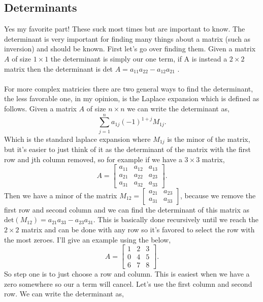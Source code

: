\documentclass{report}
\begin{document}
\begin{multicols}{2}
\section{Determinants}%
\label{sec: Determinants }
Yes my favorite part! These suck most times but are important to know. The determinant is very important for finding many things about a matrix (such as inversion) and should be known. First let's go over finding them. Given a matrix $ A $ of size $ 1 \times 1 $ the determinant is simply our one term, if A is instead a $ 2 \times 2 $ matrix then the determinant is  det $ A = a_{ 11 }a_{ 22 } - a_{ 12 }a_{ 21 } $ .\\\\
For more complex matricies there are two general ways to find the determinant, the less favorable one, in my opinion, is the Laplace expansion which is defined as follows. Given a matrix $ A $  of size $ n \times n $  we can write the determinant as, 
\[
\sum_{ j=1 } ^{ n } a_{ 1j }\left( -1 \right) ^{ 1+j }M_{ 1j }
.\] 
Which is the standard laplace expansion where $ M_{ 1j } $ is the minor of the matrix, but it's easier to just think of it as the determinant of the matrix with the first row and jth column removed, so for example if we have a $ 3 \times 3 $ matrix,
\[
A = \begin{bmatrix} a_{ 11 } & a_{ 12 } & a_{ 13 } \\ a_{ 21 } & a_{ 22 } & a_{ 23 } \\ a_{ 31 } & a_{ 32 } & a_{ 33 }\end{bmatrix}
.\] 
Then we have a minor of the matrix $ M_{ 12 } = \begin{bmatrix} a_{ 21 } & a_{ 23 } \\ a_{ 31 } & a_{ 33 }\end{bmatrix} $, because we remove the first row and second column and we can find the determinant of this matrix as $ \text{det}\left( M_{ 12 } \right) = a_{ 21 }a_{ 33 } - a_{ 23 }a_{ 31 } $. This is basically done recursively until we reach the $ 2 \times 2 $ matrix and can be done with any row so it's favored to select the row with the most zeroes. I'll give an example using the below,
\[
A= \begin{bmatrix} 1 & 2 & 3 \\ 0 & 4 & 5 \\ 6 & 7 & 8 \end{bmatrix}
.\] 
So step one is to just choose a row and column. This is easiest when we have a zero somewhere so our a term will cancel. Let's use the first column and second row. We can write the determinant as,

\end{multicols}
\end{document}
